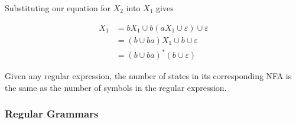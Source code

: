Substituting our equation for $X_2$ into $X_1$ gives 

\begin{align*}
      X_1&=bX_1\cup b(aX_1\cup\varepsilon)\cup\varepsilon\\
         &=(b\cup ba)X_1\cup b\cup\varepsilon\\
         &=(b\cup ba)^*(b\cup\varepsilon)
\end{align*}

Given any regular expression, the number of states in its corresponding NFA is the same as the number of symbols in the regular expression. 
\subsubsection{Regular Grammars}
